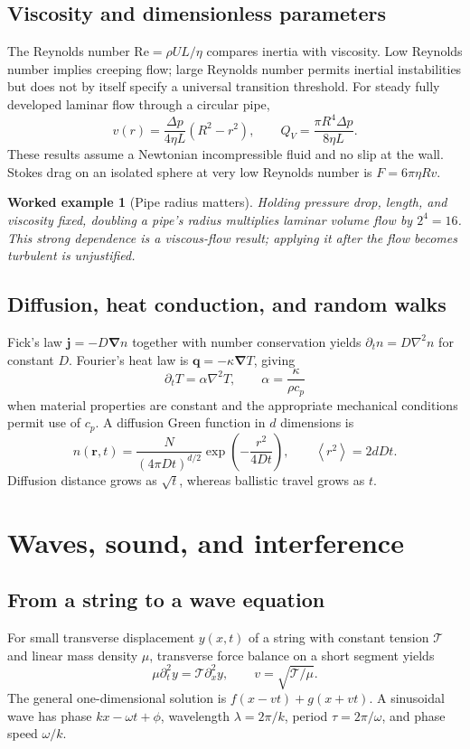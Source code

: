 \documentclass[11pt,oneside]{book}
\newcommand{\vect}[1]{\boldsymbol{#1}}
\newcommand{\grad}{\boldsymbol{\nabla}}
\newcommand{\lap}{\nabla^2}
\newcommand{\avg}[1]{\left\langle #1\right\rangle}
\theoremstyle{reviewstyle}
\newtheorem{example}{Worked example}[chapter]
\begin{document}
\section{Viscosity and dimensionless parameters}
The Reynolds number $\mathrm{Re}=\rho UL/\eta$ compares inertia with viscosity. Low Reynolds number implies creeping flow; large Reynolds number permits inertial instabilities but does not by itself specify a universal transition threshold. For steady fully developed laminar flow through a circular pipe,
\begin{equation}
v(r)=\frac{\Delta p}{4\eta L}(R^2-r^2),\qquad
Q_V=\frac{\pi R^4\Delta p}{8\eta L}.
\end{equation}
These results assume a Newtonian incompressible fluid and no slip at the wall. Stokes drag on an isolated sphere at very low Reynolds number is $F=6\pi\eta Rv$.
\begin{example}[Pipe radius matters]
Holding pressure drop, length, and viscosity fixed, doubling a pipe's radius multiplies laminar volume flow by $2^4=16$. This strong dependence is a viscous-flow result; applying it after the flow becomes turbulent is unjustified.
\end{example}
\section{Diffusion, heat conduction, and random walks}
Fick's law $\vect j=-D\grad n$ together with number conservation yields $\partial_t n=D\lap n$ for constant $D$. Fourier's heat law is $\vect q=-\kappa\grad T$, giving
\begin{equation}
\partial_tT=\alpha\lap T,\qquad \alpha=\frac{\kappa}{\rho c_p}
\end{equation}
when material properties are constant and the appropriate mechanical conditions permit use of $c_p$. A diffusion Green function in $d$ dimensions is
\begin{equation}
n(\vect r,t)=\frac{N}{(4\pi Dt)^{d/2}}\exp\left(-\frac{r^2}{4Dt}\right),\qquad \avg{r^2}=2dDt.
\end{equation}
Diffusion distance grows as $\sqrt t$, whereas ballistic travel grows as $t$.

\chapter{Waves, sound, and interference}
\section{From a string to a wave equation}
For small transverse displacement $y(x,t)$ of a string with constant tension $\mathcal T$ and linear mass density $\mu$, transverse force balance on a short segment yields
\begin{equation}
\mu\partial_t^2y=\mathcal T\partial_x^2y,\qquad v=\sqrt{\mathcal T/\mu}.
\end{equation}
The general one-dimensional solution is $f(x-vt)+g(x+vt)$. A sinusoidal wave has phase $kx-\omega t+\phi$, wavelength $\lambda=2\pi/k$, period $\tau=2\pi/\omega$, and phase speed $\omega/k$.
\end{document}
